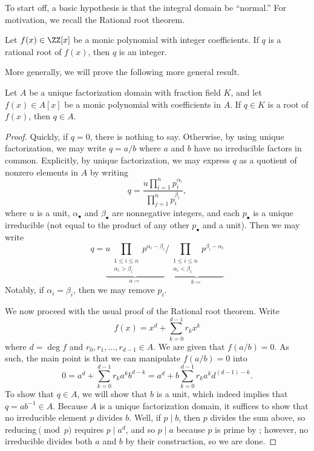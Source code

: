 \documentclass[../notes.tex]{subfiles}
\begin{document}
To start off, a basic hypothesis is that the integral domain be ``normal.'' For motivation, we recall the Rational root theorem.
\begin{theorem}
	Let $f(x)\in\ZZ[x]$ be a monic polynomial with integer coefficients. If $q$ is a rational root of $f(x)$, then $q$ is an integer.
\end{theorem}
More generally, we will prove the following more general result.
\begin{theorem} \label{thm:rrt-for-ufd}
	Let $A$ be a unique factorization domain with fraction field $K$, and let $f(x)\in A[x]$ be a monic polynomial with coefficients in $A$. If $q\in K$ is a root of $f(x)$, then $q\in A$.
\end{theorem}
\begin{proof}
	Quickly, if $q=0$, there is nothing to say. Otherwise, by using unique factorization, we may write $q=a/b$ where $a$ and $b$ have no irreducible factors in common. Explicitly, by unique factorization, we may express $q$ as a quotient of nonzero elements in $A$ by writing
	\[q=\dfrac{u\prod_{i=1}^np_i^{\alpha_i}}{\prod_{j=1}^np_i^{\beta_i}},\]
	where $u$ is a unit, $\alpha_\bullet$ and $\beta_\bullet$ are nonnegative integers, and each $p_\bullet$ is a unique irreducible (not equal to the product of any other $p_\bullet$ and a unit). Then we may write
	\[q=\underbrace{u\prod_{\substack{1\le i\le n\\\alpha_i>\beta_i}}p^{\alpha_i-\beta_i}}_{a\coloneqq}\bigg/\underbrace{\prod_{\substack{1\le i\le n\\\alpha_i<\beta_i}}p^{\beta_i-\alpha_i}}_{b\coloneqq}\]
	Notably, if $\alpha_i=\beta_i$, then we may remove $p_i$.

	We now proceed with the usual proof of the Rational root theorem. Write
	\[f(x)=x^d+\sum_{k=0}^{d-1}r_kx^k\]
	where $d=\deg f$ and $r_0,r_1,\ldots,r_{d-1}\in A$. We are given that $f(a/b)=0$. As such, the main point is that we can manipulate $f(a/b)=0$ into
	\[0=a^d+\sum_{k=0}^{d-1}r_ka^kb^{d-k}=a^d+b\sum_{k=0}^{d-1}r_ka^kd^{(d-1)-k}.\]
	To show that $q\in A$, we will show that $b$ is a unit, which indeed implies that $q=ab^{-1}\in A$. Because $A$ is a unique factorization domain, it suffices to show that no irreducible element $p$ divides $b$. Well, if $p\mid b$, then $p$ divides the sum above, so reducing$\pmod p$ requires $p\mid a^d$, and so $p\mid a$ because $p$ is prime by ; however, no irreducible divides both $a$ and $b$ by their construction, so we are done.
\end{proof}
\end{document}
